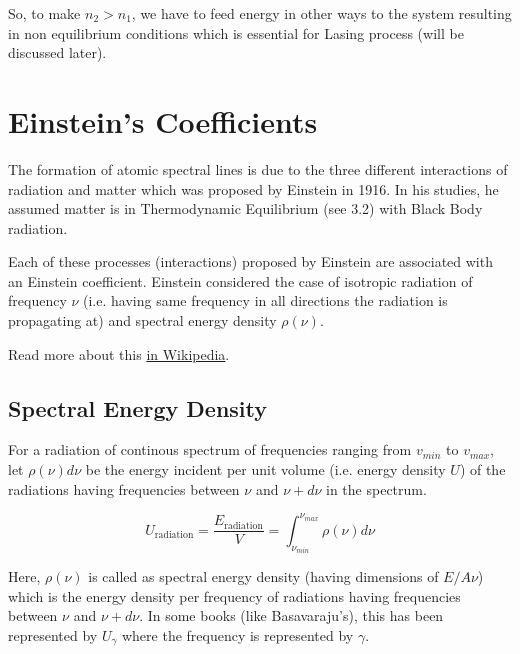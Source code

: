 \documentclass[12pt]{article}
\begin{document}
So, to make $n_{2} > n_{1}$, we have to feed energy in other ways to the system resulting in non equilibrium conditions which is essential for Lasing process (will be discussed later). 

\section{Einstein's Coefficients}

The formation of atomic spectral lines is due to the three different interactions of radiation and matter which was proposed by Einstein in 1916. In his studies, he assumed matter is in Thermodynamic Equilibrium (see 3.2) with Black Body radiation. \vspace{.2cm}

Each of these processes (interactions) proposed by Einstein are associated with an Einstein coefficient. Einstein considered the case of isotropic radiation of frequency $\nu$ (i.e. having same frequency in all directions the radiation is propagating at) and spectral energy density $\rho(\nu)$. \vspace{.2cm}

Read more about this \href{https://en.wikipedia.org/wiki/Einstein_coefficients}{in Wikipedia}.

\subsection{Spectral Energy Density}

For a radiation of continous spectrum of frequencies ranging from $v_{min}$ to $v_{max}$, let $\rho(\nu)d\nu$ be the energy incident per unit volume (i.e. energy density $U$) of the radiations having frequencies between $\nu$ and $\nu + d\nu$ in the spectrum. \vspace{.2cm}

\begin{equation}
    U_{\text{radiation}} = \frac{E_{\text{radiation}}}{V} = \int_{\nu_{min}}^{\nu_{max}} \rho(\nu) d\nu
\end{equation} \vspace{.1cm}

Here, $\rho(\nu)$ is called as spectral energy density (having dimensions of $E/A\nu$) which is the energy density per frequency of radiations having frequencies between $\nu$ and $\nu + d\nu$. In some books (like Basavaraju's), this has been represented by $U_{\gamma}$ where the frequency is represented by $\gamma$. \vspace{.2cm}
\end{document}
